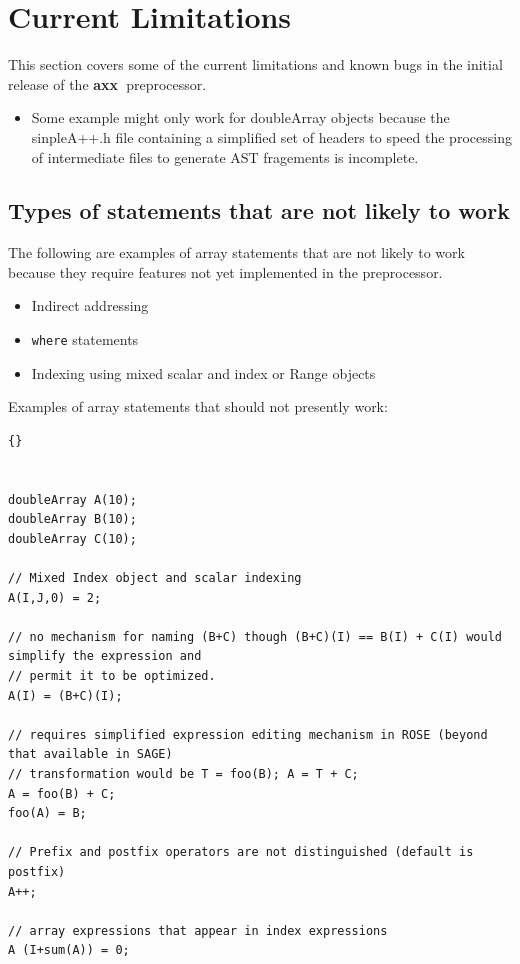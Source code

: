 \documentclass[10pt]{article}
\newcommand{\axx}{{\bf axx\ }}
\begin{document}
\section{Current Limitations}
    This section covers some of the current limitations and known bugs in the initial release of the \axx preprocessor.

\begin{itemize}
   \item Some example might only work for doubleArray objects because the sinpleA++.h file
   containing a simplified set of headers to speed the processing of intermediate files to generate
   AST fragements is incomplete.


\end{itemize}

\subsection{Types of statements that are not likely to work}

   The following are examples of array statements that are not likely to work because they require features not yet implemented in the preprocessor.

\begin{itemize}
   \item Indirect addressing
   \item {\tt where} statements
   \item Indexing using mixed scalar and index or Range objects
\end{itemize}

   Examples of array statements that should not presently work:
\vspace{0.5in}

\begin{lstlisting}{}


doubleArray A(10);
doubleArray B(10);
doubleArray C(10);

// Mixed Index object and scalar indexing
A(I,J,0) = 2;

// no mechanism for naming (B+C) though (B+C)(I) == B(I) + C(I) would simplify the expression and
// permit it to be optimized.
A(I) = (B+C)(I);

// requires simplified expression editing mechanism in ROSE (beyond that available in SAGE)
// transformation would be T = foo(B); A = T + C;
A = foo(B) + C;
foo(A) = B;

// Prefix and postfix operators are not distinguished (default is postfix)
A++;

// array expressions that appear in index expressions
A (I+sum(A)) = 0;

\end{lstlisting}
\end{document}
